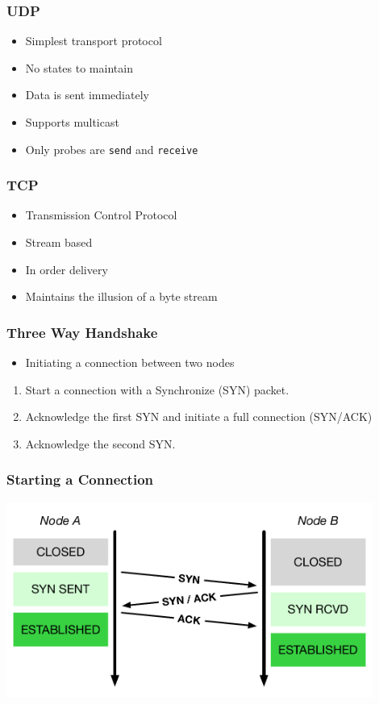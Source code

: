 \documentclass[pdftex]{beamer} %
\begin{document}
\begin{frame}[fragile]
  \frametitle{UDP}
  \begin{itemize}
  \item Simplest transport protocol
  \item No states to maintain
  \item Data is sent immediately
  \item Supports multicast
  \item Only probes are \verb+send+ and \verb+receive+
  \end{itemize}
\end{frame}

\begin{frame}
  \frametitle{TCP}
  \begin{itemize}
  \item Transmission Control Protocol
  \item Stream based
  \item In order delivery
  \item Maintains the illusion of a byte stream
  \end{itemize}
\end{frame}

\begin{frame}
  \frametitle{Three Way Handshake}
  \begin{itemize}
  \item Initiating a connection between two nodes
  \end{itemize}
  \begin{enumerate}
  \item Start a connection with a Synchronize (SYN) packet.
  \item Acknowledge the first SYN and initiate a full connection (SYN/ACK)
  \item Acknowledge the second SYN.
  \end{enumerate}
\end{frame}

\begin{frame}[fragile]
  \frametitle{Starting a Connection}
\centering
\includegraphics[width=0.9\textwidth]{../../figures/tcp-three-way.pdf}
\end{frame}
\end{document}

